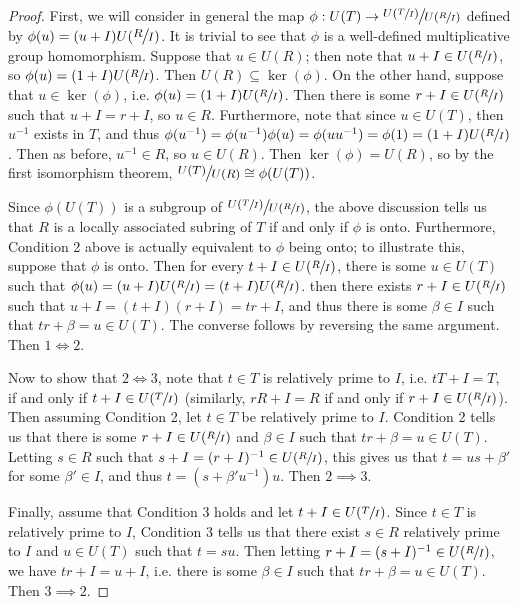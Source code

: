 \documentclass[12pt]{amsart}
\theoremstyle{definition}
\newcommand{\quot}[2]{\large\sfrac{#1}{#2}\normalsize}
\begin{document}
	\begin{proof}
		First, we will consider in general the map $\phi:U(T)\to \quot{U(\sfrac{T}{I})}{U(\sfrac{R}{I})}$ defined by $\phi(u)=(u+I)U(\quot{R}{I})$. It is trivial to see that $\phi$ is a well-defined multiplicative group homomorphism. Suppose that $u\in U(R)$; then note that $u+I\in U(\sfrac{R}{I})$, so $\phi(u)=(1+I)U(\sfrac{R}{I})$. Then $U(R)\subseteq \ker(\phi)$. On the other hand, suppose that $u\in \ker(\phi)$, i.e. $\phi(u)=(1+I)U(\sfrac{R}{I})$. Then there is some $r+I\in U(\sfrac{R}{I})$ such that $u+I=r+I$, so $u\in R$. Furthermore, note that since $u\in U(T)$, then $u^{-1}$ exists in $T$, and thus $\phi(u^{-1})=\phi(u^{-1})\phi(u)=\phi(uu^{-1})=\phi(1)=(1+I)U(\sfrac{R}{I})$. Then as before, $u^{-1}\in R$, so $u\in U(R)$. Then $\ker(\phi)=U(R)$, so by the first isomorphism theorem, $\quot{U(T)}{U(R)}\cong \phi(U(T))$.
		
		Since $\phi(U(T))$ is a subgroup of $\quot{U(\sfrac{T}{I})}{U(\sfrac{R}{I})}$, the above discussion tells us that $R$ is a locally associated subring of $T$ if and only if $\phi$ is onto. Furthermore, Condition 2 above is actually equivalent to $\phi$ being onto; to illustrate this, suppose that $\phi$ is onto. Then for every $t+I\in U(\sfrac{R}{I})$, there is some $u\in U(T)$ such that $\phi(u)=(u+I)U(\sfrac{R}{I})=(t+I)U(\sfrac{R}{I})$. then there exists $r+I\in U(\sfrac{R}{I})$ such that $u+I=(t+I)(r+I)=tr+I$, and thus there is some $\beta\in I$ such that $tr+\beta=u\in U(T)$. The converse follows by reversing the same argument. Then $1\iff 2$.
		
		Now to show that $2\iff 3$, note that $t\in T$ is relatively prime to $I$, i.e. $tT+I=T$, if and only if $t+I\in U(\sfrac{T}{I})$ (similarly, $rR+I=R$ if and only if $r+I\in U(\sfrac{R}{I})$). Then assuming Condition 2, let $t\in T$ be relatively prime to $I$. Condition 2 tells us that there is some $r+I\in U(\sfrac{R}{I})$ and $\beta\in I$ such that $tr+\beta=u\in U(T)$. Letting $s\in R$ such that $s+I=(r+I)^{-1}\in U(\sfrac{R}{I})$, this gives us that $t=us+\beta'$ for some $\beta'\in I$, and thus $t=(s+\beta'u^{-1})u$. Then $2\implies 3$.
			
		Finally, assume that Condition 3 holds and let $t+I\in U(\sfrac{T}{I})$. Since $t\in T$ is relatively prime to $I$, Condition 3 tells us that there exist $s\in R$ relatively prime to $I$ and $u\in U(T)$ such that $t=su$. Then letting $r+I=(s+I)^{-1}\in U(\sfrac{R}{I})$, we have $tr+I=u+I$, i.e. there is some $\beta\in I$ such that $tr+\beta=u\in U(T)$. Then $3\implies 2$.
	\end{proof}
	
\end{document}
